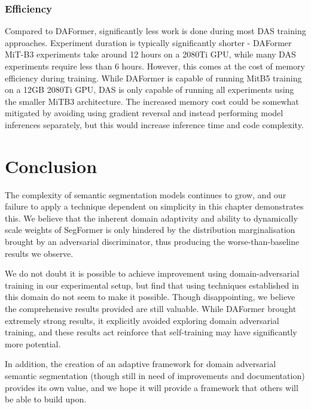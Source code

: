 \documentclass[a4paper,12pt]{report}
\begin{document}
\subsubsection{Efficiency}
Compared to DAFormer, significantly less work is done during most DAS training approaches. Experiment duration is typically significantly shorter - DAFormer MiT-B3 experiments take around 12 hours on a 2080Ti GPU, while many DAS experiments require less than 6 hours. However, this comes at the cost of memory efficiency during training. While DAFormer is capable of running MitB5 training on a 12GB 2080Ti GPU, DAS is only capable of running all experiments using the smaller MiTB3 architecture. The increased memory cost could be somewhat mitigated by avoiding using gradient reversal and instead performing model inferences separately, but this would increase inference time and code complexity.

\section{Conclusion}
The complexity of semantic segmentation models continues to grow, and our failure to apply a technique dependent on simplicity in this chapter demonstrates this. We believe that the inherent domain adaptivity and ability to dynamically scale weights of SegFormer is only hindered by the distribution marginalisation brought by an adversarial discriminator, thus producing the worse-than-baseline results we observe.

We do not doubt it is possible to achieve improvement using domain-adversarial training in our experimental setup, but find that using techniques established in this domain do not seem to make it possible. Though disappointing, we believe the comprehensive results provided are still valuable. While DAFormer brought extremely strong results, it explicitly avoided exploring domain adversarial training, and these results act reinforce that self-training may have significantly more potential.

In addition, the creation of an adaptive framework for domain adversarial semantic segmentation (though still in need of improvements and documentation) provides its own value, and we hope it will provide a framework that others will be able to build upon.
\end{document}
